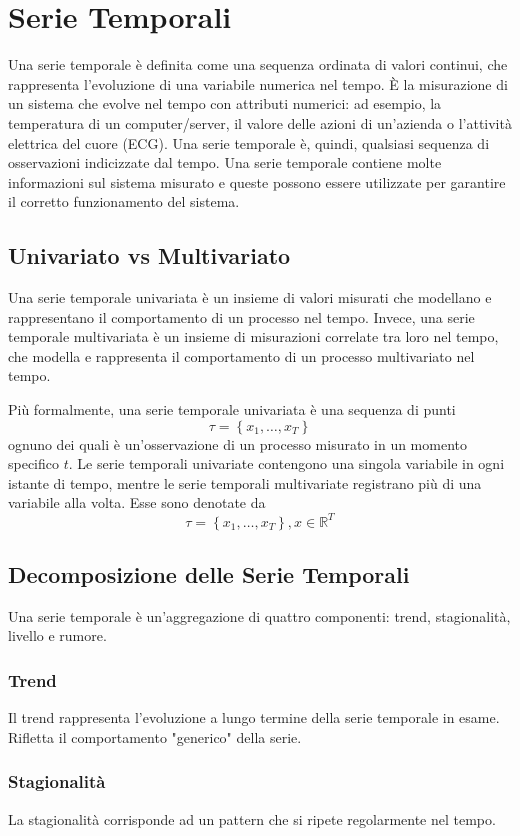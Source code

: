 \section{Serie Temporali}
Una serie temporale è definita come una sequenza ordinata di valori continui, che rappresenta l'evoluzione di una variabile numerica nel tempo. È la misurazione di un sistema che evolve nel tempo con attributi numerici: ad esempio, la temperatura di un computer/server, il valore delle azioni di un'azienda o l'attività elettrica del cuore (ECG). Una serie temporale è, quindi, qualsiasi sequenza di osservazioni indicizzate dal tempo. Una serie temporale contiene molte informazioni sul sistema misurato e queste possono essere utilizzate per garantire il corretto funzionamento del sistema.

\subsection{Univariato vs Multivariato}
Una serie temporale univariata è un insieme di valori misurati che modellano e rappresentano il comportamento di un processo nel tempo. Invece, una serie temporale multivariata è un insieme di misurazioni correlate tra loro nel tempo, che modella e rappresenta il comportamento di un processo multivariato nel tempo. 

Più formalmente, una serie temporale univariata è una sequenza di punti
\[\tau = \left\{ x_1, \ldots, x_T  \right\}\]
ognuno dei quali è un'osservazione di un processo misurato in un momento specifico $t$. Le serie temporali univariate contengono una singola variabile in ogni istante di tempo, mentre le serie temporali multivariate registrano più di una variabile alla volta. Esse sono denotate da
\[\tau = \left\{ x_1, \ldots, x_T  \right\}, x \in \mathbb{R}^T \]

\subsection{Decomposizione delle Serie Temporali}
Una serie temporale è un'aggregazione di quattro componenti: trend, stagionalità, livello e rumore.

\subsubsection{Trend}
Il trend rappresenta l'evoluzione a lungo termine della serie temporale in esame. Rifletta il comportamento "generico" della serie.

\subsubsection{Stagionalità}
La stagionalità corrisponde ad un pattern che si ripete regolarmente nel tempo.

